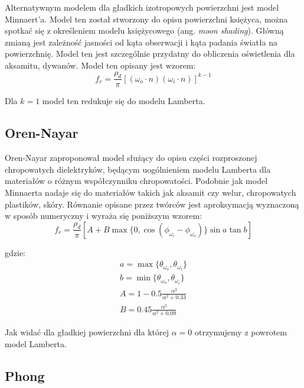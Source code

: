 \documentclass[../main.tex]{subfiles}
\begin{document}
Alternatywnym modelem dla gładkich izotropowych powierzchni jest model
Minnaert'a. Model ten został stworzony do opisu powierzchni księżyca, można
spotkać się z określeniem modelu księżycowego (ang. \textit{moon shading}).
Główną zmianą jest zależność jasności od kąta obserwacji i kąta padania światła
na powierzchnię.  Model ten jest szczególnie przydatny do obliczenia
oświetlenia dla aksamitu, dywanów. Model ten opisany jest wzorem:
\[
  f_r = \frac{\rho_d}{\pi} \left[
    (\omega_o \cdot n) (\omega_i \cdot n)
  \right]^{k-1}
\]

\noindent Dla $k=1$ model ten redukuje się do modelu Lamberta.

\subsection{Oren-Nayar}

Oren-Nayar zaproponował model służący do opisu części rozproszonej chropowatych
dielektryków, będącym uogólnieniem modelu Lamberta dla materiałów o różnym
współczynniku chropowatości. Podobnie jak model Minnaerta nadaje się do
materiałów takich jak aksamit czy welur, chropowatych plastików,
skóry. Równanie opisane przez twórców jest aproksymacją wyznaczoną w sposób numeryczny i wyraża się poniższym
wzorem:
\[
  f_r = \frac{\rho_d}{\pi} \left[
    A +
    B
      \max\{ 0, \cos\left(\phi_{\omega_i} - \phi_{\omega_o}\right) \}
      \sin a \tan b
  \right]
\]


\noindent gdzie:
\begin{gather*}
  a = \max \{ \theta_{\omega_o}, \theta_{\omega_i} \} \\
  b = \min \{ \theta_{\omega_o}, \theta_{\omega_i} \} \\
  A = 1 - 0.5 \frac{\alpha^2}{\alpha^2 + 0.33} \\
  B = 0.45 \frac{\alpha^2}{\alpha^2 + 0.09}
\end{gather*}

Jak widać dla gładkiej powierzchni dla której $\alpha=0$ otrzymujemy
z powrotem model Lamberta.


\subsection{Phong}
\end{document}
